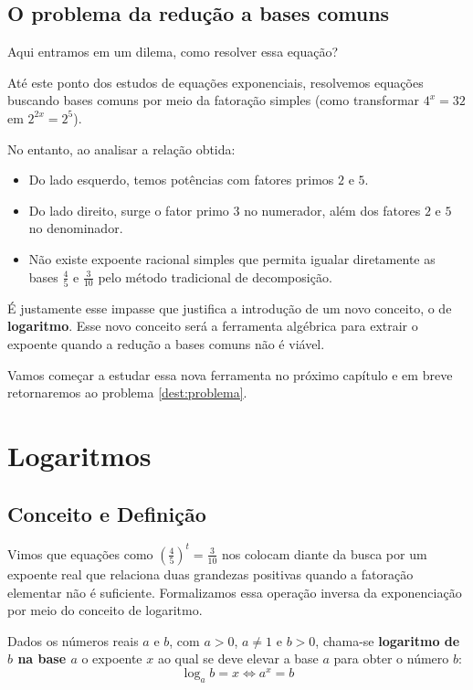 \documentclass[12pt,a4paper]{report}
\begin{document}
	\section{O problema da redução a bases comuns}
	
	Aqui entramos em um dilema, como resolver essa equação?	
	
	Até este ponto dos estudos de equações exponenciais, resolvemos equações buscando bases comuns por meio da fatoração simples (como transformar $4^x = 32$ em $2^{2x} = 2^5$). 
	
	No entanto, ao analisar a relação obtida:
	\begin{itemize}[label=$\circ$]
		\item Do lado esquerdo, temos potências com fatores primos $2$ e $5$.
		\item Do lado direito, surge o fator primo $3$ no numerador, além dos fatores $2$ e $5$ no denominador.
		\item Não existe expoente racional simples que permita igualar diretamente as bases $\frac{4}{5}$ e $\frac{3}{10}$ pelo método tradicional de decomposição.
	\end{itemize}
	
	É justamente esse impasse que justifica a introdução de um novo conceito, o de \textbf{logaritmo}. Esse novo conceito será a ferramenta algébrica para extrair o expoente quando a redução a bases comuns não é viável.
	
	Vamos começar a estudar essa nova ferramenta no próximo capítulo e em breve retornaremos ao problema \ref{dest:problema}.
	
	
	\chapter{Logaritmos}
	\label{chap:logaritmos}
	
	\section{Conceito e Definição}
	
	Vimos que equações como $\left(\frac{4}{5}\right)^t = \frac{3}{10}$ nos colocam diante da busca por um expoente real que relaciona duas grandezas positivas quando a fatoração elementar não é suficiente. Formalizamos essa operação inversa da exponenciação por meio do conceito de logaritmo.
	
	\begin{destaque}
		Dados os números reais $a$ e $b$, com $a > 0$, $a \neq 1$ e $b > 0$, chama-se \textbf{logaritmo de $b$ na base $a$} o expoente $x$ ao qual se deve elevar a base $a$ para obter o número $b$:
		$$\log_a b = x \iff a^x = b$$
	\end{destaque}
	
\end{document}
